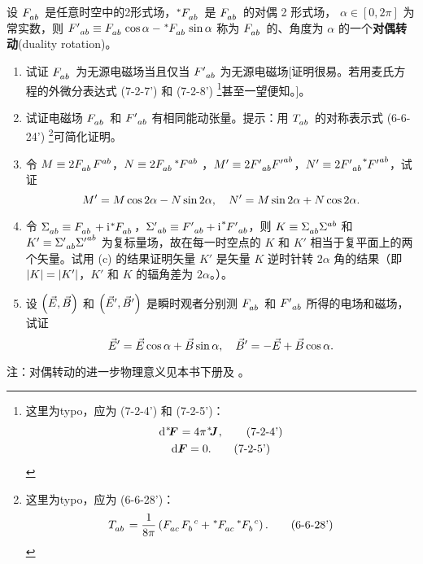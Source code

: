 \begin{xiti}
	\item 设 $\tensor{F}{_a_b}$ 是任意时空中的2形式场，$\tensor[^*]{F}{_a_b}$ 是 $\tensor{F}{_a_b}$ 的对偶 2 形式场， $\alpha \in \left[ 0,2\pi \right]$ 为常实数，则 $\tensor{{F'}}{_a_b} \equiv \tensor{F}{_a_b} \cos \alpha - \tensor[^*]{F}{_a_b} \sin \alpha$ 称为 $\tensor{F}{_a_b}$ 的、角度为 $\alpha$ 的一个\textbf{对偶转动}(duality rotation)。
	\begin{enumerate}[label = (\alph*)]
		\item 试证 $\tensor{F}{_a_b}$ 为无源电磁场当且仅当 $\tensor{{F'}}{_a_b}$ 为无源电磁场[证明很易。若用麦氏方程的外微分表达式 (7-2-7') 和 (7-2-8') \footnote{这里为typo，应为 (7-2-4') 和 (7-2-5')：
		\begin{gather*}
			\dd{\tensor[^*]{\!\form{F}}{}} = 4 \pi \tensor[^*]{\!\form{J}}{}, \tag{7-2-4'}\\
			\dd{\form{F}} = 0. \tag{7-2-5'}
		\end{gather*}}甚至一望便知。]。
		\item 试证电磁场 $\tensor{F}{_a_b}$ 和 $\tensor{{F'}}{_a_b}$ 有相同能动张量。提示：用 $\tensor{T}{_a_b}$ 的对称表示式 (6-6-24') \footnote{
			这里为typo，应为 (6-6-28')：
			\begin{equation*}
				\tensor{T}{_a_b} = \frac{1}{8\pi} \left( \tensor{F}{_a_c} \tensor{F}{_b^c} + \tensor[^*]{F}{_a_c} \tensor[^*]{F}{_b^c} \right). \tag{6-6-28'}
			\end{equation*}
		}可简化证明。
		\item 令 $M\equiv 2 \tensor{F}{_a_b} \tensor{F}{^a^b}$，$N\equiv 2 \tensor{F}{_a_b} \tensor[^*]{F}{^a^b}$ ，$M' \equiv 2 \tensor{{F'}}{_a_b} \tensor{{F'}}{^a^b}$，$N' \equiv 2 \tensor{{F'}}{_a_b} \tensor[^*]{{F'}}{^a^b}$，试证
		\begin{equation*}
			M' = M \cos 2\alpha - N \sin 2\alpha \qc N' = M \sin 2\alpha + N \cos 2\alpha.
		\end{equation*}
		\item 令 $\tensor{\Sigma}{_a_b} \equiv \tensor{F}{_a_b} + \ii \tensor[^*]{F}{_a_b}$，$\tensor{{\Sigma'}}{_a_b} \equiv \tensor{{F'}}{_a_b} + \ii \tensor[^*]{{F'}}{_a_b}$，则 $K \equiv \tensor{\Sigma}{_a_b} \tensor{\Sigma}{^a^b}$ 和 $K' \equiv \tensor{{\Sigma'}}{_a_b} \tensor{{\Sigma'}}{^a^b}$ 为复标量场，故在每一时空点的 $K$ 和 $K'$ 相当于复平面上的两个矢量。试用 (c) 的结果证明矢量 $K'$ 是矢量 $K$ 逆时针转 $2\alpha$ 角的结果（即 $\abs{K} = \abs{K'}$，$K'$ 和 $K$ 的辐角差为 $2\alpha$。）。
		\item 设 $\left( \vec{E}, \vec{B} \right)$ 和 $\left( \vec{E}' , \vec{B}' \right)$ 是瞬时观者分别测 $\tensor{F}{_a_b}$ 和 $\tensor{{F'}}{_a_b}$ 所得的电场和磁场，试证
		\begin{equation*}
			\myvec{E}' = \myvec{E} \cos \alpha + \myvec{B} \sin \alpha \qc \myvec{B}' = - \myvec{E} + \myvec{B} \cos \alpha.
		\end{equation*}
	\end{enumerate}
	注：对偶转动的进一步物理意义见本书下册及 \cite{Jackson1975}。


\end{xiti}
